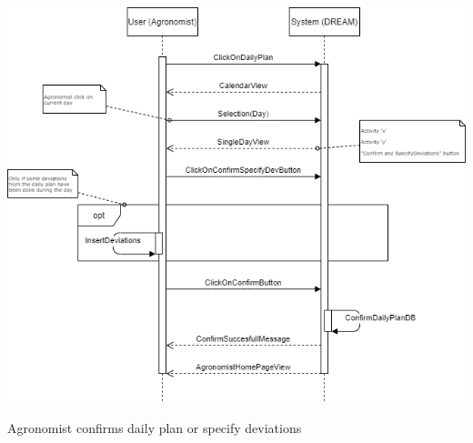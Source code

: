 \documentclass{article}
\begin{document}
\begin{center}
    \includegraphics[width=1.0\textwidth]{images/sequenceDiagrams/18. AgronomistConfirmDailyPlan.png}
    \par
    \caption{\label{fig:frog}Agronomist confirms daily plan or specify deviations}

    \newpage
    
    
    
    
    
    
    
    
    
    
    
    
    

\end{center}
\end{document}
